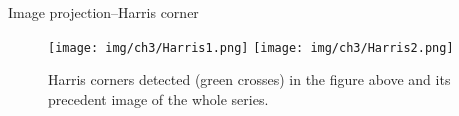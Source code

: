 \begin{frame}{Image projection--Harris corner}
    \begin{figure}
        \hspace*{-15pt}
        \texttt{[image: img/ch3/Harris1.png]}
        \texttt{[image: img/ch3/Harris2.png]}
        \caption{Harris corners detected (green crosses) in the figure above and its precedent image of the whole series. }
    \end{figure}
\end{frame}
